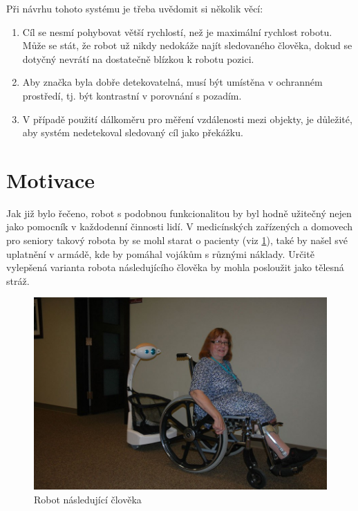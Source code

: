 \documentclass[twoside]{ctuthesis}
\theoremstyle{plain}
\theoremstyle{definition}
\theoremstyle{note}
\begin{document}
Při návrhu tohoto systému je třeba uvědomit si několik věcí:
\begin{enumerate}
	\item Cíl se nesmí pohybovat větší rychlostí, než je maximální rychlost robotu. Může se stát, že robot už nikdy nedokáže najít sledovaného člověka, dokud se dotyčný nevrátí na dostatečně blízkou k robotu pozici.
	
	\item Aby značka byla dobře detekovatelná, musí být umístěna v ochranném prostředí, tj. být kontrastní v porovnání s pozadím.
	
	\item V případě použití dálkoměru pro měření vzdálenosti mezi objekty, je důležité, aby systém nedetekoval sledovaný cíl jako překážku.
\end{enumerate}

\section{Motivace}

Jak již bylo řečeno, robot s podobnou funkcionalitou by byl hodně užitečný nejen jako pomocník v každodenní činnosti lidí. V medicínských zařízených a domovech pro seniory takový robota by se mohl starat o pacienty (viz \ref{rnc}), také by našel své uplatnění v armádě, kde by pomáhal vojákům s různými náklady. Určitě vylepšená varianta robota následujícího člověka by mohla posloužit jako tělesná stráž.


\begin{figure}
	\caption{Robot následující člověka}
	
	\label{rnc}
	\includegraphics[width=\textwidth]{images/0/maxresdefault.jpg}
\end{figure}
\end{document}
